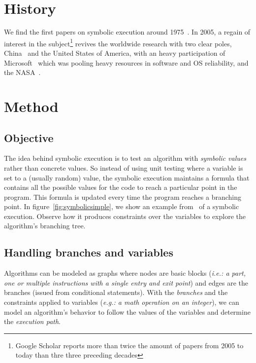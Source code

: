 \documentclass[11pt, conference]{IEEEtran}
\begin{document}
  \section{History}
    We find the first papers on symbolic execution around 1975~\cite{newapproach}. In 2005, a regain of interest in the subject\footnote{Google Scholar reports more than twice the amount of papers from 2005 to today than thre three preceding decades} revives the worldwide research with two clear poles, China~\cite{Hardware, memorytablemodel, CHEN2018118} and the United States of America, with an heavy participation of Microsoft~\cite{bouncer-securing-software-by-blocking-bad-input} which was pooling heavy resources in software and OS reliability, and the NASA~\cite{neurosymbolicexecution, DirectedIncrementalSymExe, visserWillemCorina}.

  \section{Method}
    \subsection{Objective}
      The idea behind symbolic execution is to test an algorithm with \emph{symbolic values} rather than concrete values. So instead of using unit testing where a variable is set to a (usually random) value, the symbolic execution maintains a formula that contains all the possible values for the code to reach a particular point in the program. This formula is updated every time the program reaches a branching point. In figure~\ref{fig:symbolicsimple}, we show an example from~\cite{visserWillemCorina} of a symbolic execution. Observe how it produces constraints over the variables to explore the algorithm's branching tree.
    \subsection{Handling branches and variables}
      Algorithms can be modeled as graphs where nodes are basic blocks (\emph{i.e.: a part, one or multiple instructions with a single entry and exit point}) and edges are the branches (issued from conditional statements). With the \emph{branches} and the constraints applied to variables (\emph{e.g.: a math operation on an integer}), we can model an algorithm's behavior to follow the values of the variables and determine the \emph{execution path}.
\end{document}

